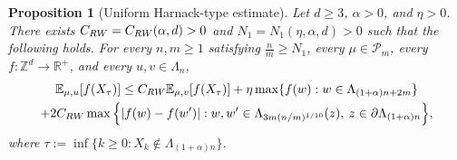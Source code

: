 \documentclass[11pt,a4paper]{article}
\numberwithin{equation}{section}
\theoremstyle{plain}
\newtheorem{Prop}[Thm]{Proposition}
\theoremstyle{definition}
\begin{document}
\begin{Prop}[Uniform Harnack-type estimate]\label{prop:uniform Harnack} Let $d\geq 3$, $\alpha>0$, and $\eta>0$. There exists $C_{\rm RW}=C_{\rm RW}(\alpha,d)>0$ and $N_1=N_1(\eta,\alpha,d)>0$ such that the following holds. For every $n,m\geq 1$ satisfying $\tfrac{n}{m}\geq N_1$, every $\mu\in \mathcal P_m$, every $f:\mathbb Z^d\rightarrow \mathbb R^+$, and every $u,v\in \Lambda_n$,
\begin{multline}
	\mathbb E_{\mu,u}[f(X_\tau)]\leq C_{\rm RW}\mathbb E_{\mu,v}[f(X_\tau)] +\eta\max\{f(w):w\in \Lambda_{(1+\alpha)n+2m}\}\\+2C_{\rm RW}\max\Big\{|f(w)-f(w')|: w,w'\in \Lambda_{3m(n/m)^{1/10}}(z), \: z\in \partial \Lambda_{(1+\alpha)n}\Big\},
\end{multline}
where $\tau:=\inf \{k\geq 0: X_k\notin \Lambda_{(1+\alpha)n}\}$.
\end{Prop}
\end{document}
